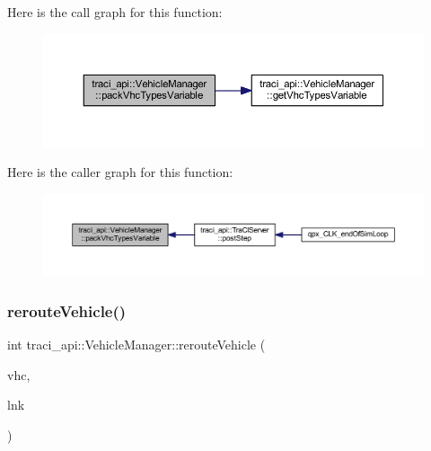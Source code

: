 Here is the call graph for this function\+:\nopagebreak
\begin{figure}[H]
\begin{center}
\leavevmode
\includegraphics[width=350pt]{classtraci__api_1_1_vehicle_manager_abf96c7635d046d03bc02aa0cbc384d17_cgraph}
\end{center}
\end{figure}
Here is the caller graph for this function\+:\nopagebreak
\begin{figure}[H]
\begin{center}
\leavevmode
\includegraphics[width=350pt]{classtraci__api_1_1_vehicle_manager_abf96c7635d046d03bc02aa0cbc384d17_icgraph}
\end{center}
\end{figure}
\mbox{\label{classtraci__api_1_1_vehicle_manager_a47a471305d82ae97f65ac2c90f384baa}} 
\subsubsection{\texorpdfstring{reroute\+Vehicle()}{rerouteVehicle()}}
{\footnotesize\ttfamily int traci\+\_\+api\+::\+Vehicle\+Manager\+::reroute\+Vehicle (\begin{DoxyParamCaption}\item[{V\+E\+H\+I\+C\+LE $\ast$}]{vhc,  }\item[{L\+I\+NK $\ast$}]{lnk }\end{DoxyParamCaption})}

